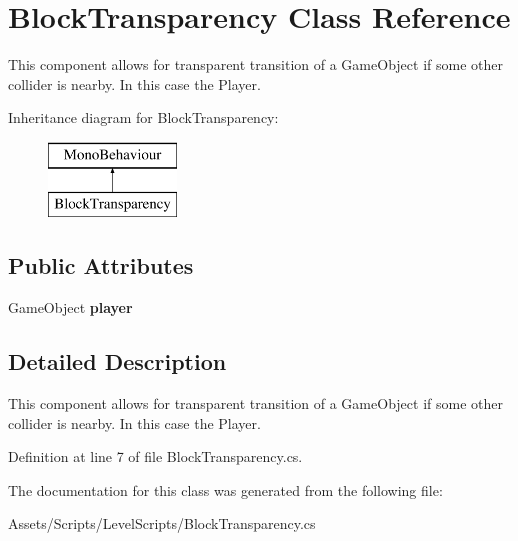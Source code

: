 \hypertarget{class_block_transparency}{\section{Block\+Transparency Class Reference}
\label{class_block_transparency}
}


This component allows for transparent transition of a Game\+Object if some other collider is nearby. In this case the Player.  


Inheritance diagram for Block\+Transparency\+:\begin{figure}[H]
\begin{center}
\leavevmode
\includegraphics[height=2.000000cm]{class_block_transparency}
\end{center}
\end{figure}
\subsection*{Public Attributes}
\begin{DoxyCompactItemize}
\item 
\hypertarget{class_block_transparency_a7c5f9720e40e90ec89cd73ef14ee6623}{Game\+Object {\bfseries player}}\label{class_block_transparency_a7c5f9720e40e90ec89cd73ef14ee6623}

\end{DoxyCompactItemize}


\subsection{Detailed Description}
This component allows for transparent transition of a Game\+Object if some other collider is nearby. In this case the Player. 



Definition at line 7 of file Block\+Transparency.\+cs.



The documentation for this class was generated from the following file\+:\begin{DoxyCompactItemize}
\item 
Assets/\+Scripts/\+Level\+Scripts/Block\+Transparency.\+cs\end{DoxyCompactItemize}
